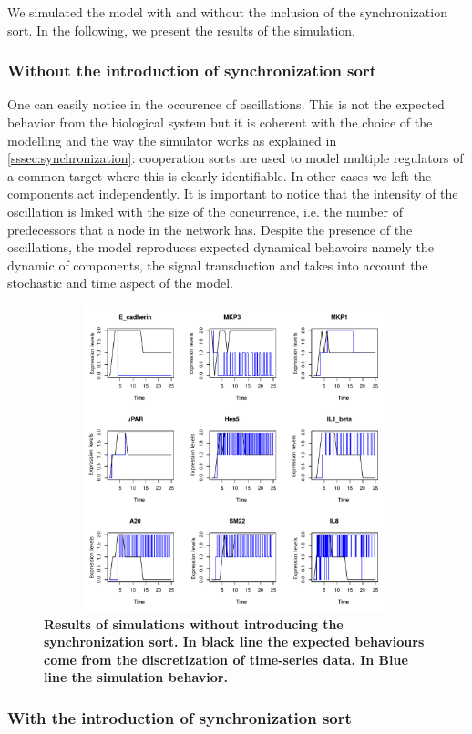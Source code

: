 We simulated the model with and without the inclusion of the synchronization sort. In the following, we present the results of 
the simulation.

\subsubsection{Without the introduction of synchronization sort}
One can easily notice in  the occurence of oscillations. This is not the expected behavior from the biological system
but it is coherent with the choice of the modelling and the way the simulator works as explained in \ref{sssec:synchronization}: cooperation
sorts are used to model multiple regulators of a common target
where this is clearly identifiable. In other cases we left the components act independently.
It is important to notice that the intensity of the oscillation is linked with 
the size of the concurrence, i.e. the number of predecessors that a node in the network has.
Despite the presence of the oscillations, the model reproduces expected dynamical behavoirs  namely
the dynamic of components, the signal transduction and takes into account the stochastic and time aspect of the model.

\begin{figure}[!t]
\centering
\includegraphics[width=6.5in,height=3.5in]{images/resultWOS.pdf}
\caption{\bf Results of simulations without introducing the synchronization sort. In black line the expected behaviours
come from the discretization of time-series data. In Blue line the simulation behavior.}
\label{fig:rwos}
\end{figure}
\subsubsection{With the introduction of synchronization sort}

